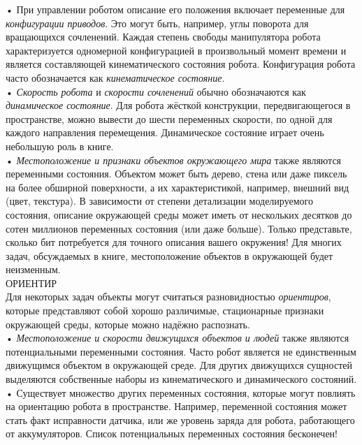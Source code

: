 \documentclass[10pt,a4paper]{article}
\begin{document}
 • При управлении роботом описание его положения включает переменные для \textit{конфигурации приводов}. Это могут быть, например, углы поворота для вращающихся сочленений. 
 Каждая степень свободы  манипулятора робота характеризуется одномерной конфигурацией в произвольный момент времени и является составляющей кинематического состояния робота. Конфигурация робота часто обозначается как \textit{кинематическое состояние}.\\
  
 • \textit{Скорость робота} и \textit{скорости сочленений} обычно обозначаются как \textit{динамическое состояние}. Для робота жёсткой конструкции, передвигающегося в пространстве, можно вывести до шести переменных скорости, по одной для каждого направления перемещения.  Динамическое состояние играет очень небольшую роль в книге.\\
 
 • \textit{Местоположение и признаки объектов окружающего  мира} также являются переменными состояния. Объектом может быть дерево, стена или даже пиксель на более обширной поверхности, а их характеристикой, например, внешний вид (цвет, текстура). В зависимости от степени детализации моделируемого состояния, описание окружающей среды может иметь от нескольких десятков до сотен миллионов переменных состояния (или даже больше). Только представьте, сколько бит потребуется для точного описания вашего окружения! Для многих задач, обсуждаемых в книге, местоположение объектов в окружающей будет неизменным.\\
 ОРИЕНТИР \\
 Для некоторых задач объекты могут считаться разновидностью \textit{ориентиров}, которые представляют собой хорошо различимые, стационарные признаки окружающей среды, которые можно надёжно распознать.\\
  
 • \textit{Местоположение и скорости движущихся объектов и людей} также являются потенциальными переменными состояния. Часто робот является не единственным движущимся объектом в окружающей среде. Для других движущихся сущностей выделяются собственные наборы из кинематического и динамического состояний.\\
 
 • Существует множество других переменных состояния, которые могут повлиять на ориентацию робота в пространстве. Например, переменной состояния может стать факт исправности датчика, или же уровень заряда для робота, работающего от аккумуляторов. Список потенциальных переменных состояния бесконечен!\\
 
\end{document}

